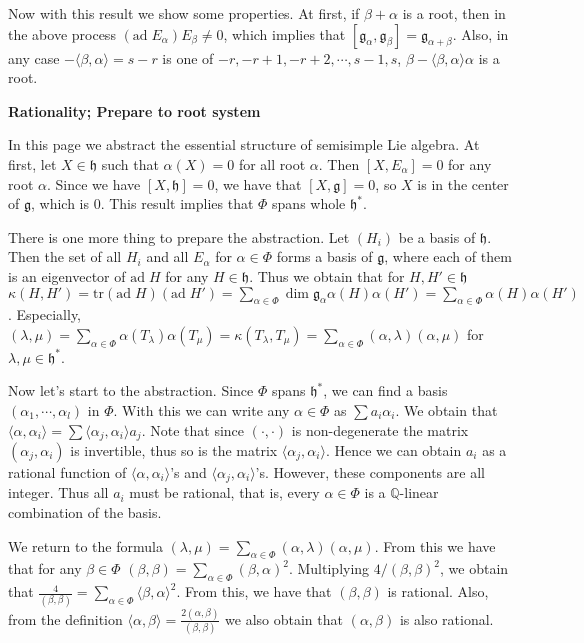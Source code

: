 \documentclass{article}
\newcommand{\RaQ}{\mathbb{Q}}
\newcommand{\tr}[1]{\mathrm{tr}#1}
\newcommand{\lie}[1]{\mathfrak{#1}}
\newcommand{\ad}[1]{\mathrm{ad}\; #1}
\begin{document}
Now with this result we show some properties.
At first, if $\beta + \alpha$ is a root, then in the above process $(\ad{E_\alpha}) E_\beta \ne 0$, which implies that $[\lie{g}_\alpha, \lie{g}_\beta] = \lie{g}_{\alpha + \beta}$.
Also, in any case $-\langle \beta, \alpha \rangle = s - r$ is one of $-r, -r + 1, -r + 2, \cdots, s - 1, s$, $\beta - \langle \beta, \alpha \rangle \alpha$ is a root.

\newpage

\textbf{Rationality; Prepare to root system}

In this page we abstract the essential structure of semisimple Lie algebra.
At first, let $X \in \lie{h}$ such that $\alpha(X) = 0$ for all root $\alpha$.
Then $[X, E_\alpha] = 0$ for any root $\alpha$.
Since we have $[X, \lie{h}] = 0$, we have that $[X, \lie{g}] = 0$, so $X$ is in the center of $\lie{g}$, which is 0.
This result implies that $\Phi$ spans whole $\lie{h}^*$.

There is one more thing to prepare the abstraction.
Let $(H_i)$ be a basis of $\lie{h}$.
Then the set of all $H_i$ and all $E_\alpha$ for $\alpha \in \Phi$ forms a basis of $\lie{g}$, where each of them is an eigenvector of $\ad{H}$ for any $H \in \lie{h}$.
Thus we obtain that for $H, H' \in \lie{h}$ $\kappa(H, H') = \tr{(\ad{H})(\ad{H'})} = \sum_{\alpha \in \Phi} \dim{\lie{g}_\alpha} \alpha(H) \alpha(H') = \sum_{\alpha \in \Phi} \alpha(H) \alpha(H')$.
Especially, $(\lambda, \mu) = \sum_{\alpha \in \Phi} \alpha(T_\lambda) \alpha(T_\mu) = \kappa(T_\lambda, T_\mu) = \sum_{\alpha \in \Phi} (\alpha, \lambda) (\alpha, \mu)$ for $\lambda, \mu \in \lie{h}^*$.

Now let's start to the abstraction.
Since $\Phi$ spans $\lie{h}^*$, we can find a basis $(\alpha_1, \cdots, \alpha_l)$ in $\Phi$.
With this we can write any $\alpha \in \Phi$ as $\sum a_i \alpha_i$.
We obtain that $\langle \alpha, \alpha_i \rangle = \sum \langle \alpha_j, \alpha_i \rangle a_j$.
Note that since $(\cdot, \cdot)$ is non-degenerate the matrix $(\alpha_j, \alpha_i)$ is invertible, thus so is the matrix $\langle \alpha_j, \alpha_i \rangle$.
Hence we can obtain $a_i$ as a rational function of $\langle \alpha, \alpha_i \rangle$'s and $\langle \alpha_j, \alpha_i \rangle$'s.
However, these components are all integer.
Thus all $a_i$ must be rational, that is, every $\alpha \in \Phi$ is a $\RaQ$-linear combination of the basis.

We return to the formula $(\lambda, \mu) = \sum_{\alpha \in \Phi} (\alpha, \lambda) (\alpha, \mu)$.
From this we have that for any $\beta \in \Phi$ $(\beta, \beta) = \sum_{\alpha \in \Phi} (\beta, \alpha)^2$.
Multiplying $4 / (\beta, \beta)^2$, we obtain that $\frac{4}{(\beta, \beta)} = \sum_{\alpha \in \Phi} \langle \beta, \alpha \rangle^2$.
From this, we have that $(\beta, \beta)$ is rational.
Also, from the definition $\langle \alpha, \beta \rangle = \frac{2(\alpha, \beta)}{(\beta, \beta)}$ we also obtain that $(\alpha, \beta)$ is also rational.
\end{document}
